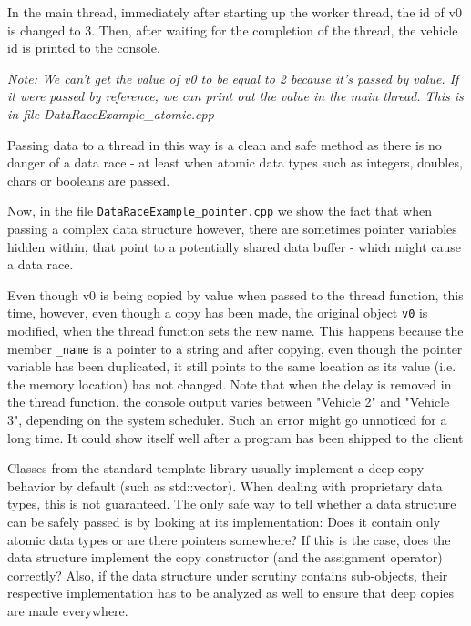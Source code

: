 \documentclass[11pt, a4paper]{article}
\begin{document}
In the main thread, immediately after starting up the worker thread, the id of v0 is changed to 3. Then, after waiting for the completion of the thread, the vehicle id is printed to the console.


\textit{Note: We can't get the value of v0 to be equal to 2 because it's passed by value. If it were passed by reference, we can print out the value in the main thread. This is in file DataRaceExample\_atomic.cpp}




Passing data to a thread in this way is a clean and safe method as there is no danger of a data race - at least when atomic data types such as integers, doubles, chars or booleans are passed.


Now, in the file \texttt{DataRaceExample\_pointer.cpp} we show the fact that when passing a complex data structure however, there are sometimes pointer variables hidden within, that point to a potentially shared data buffer - which might cause a data race. 


Even though v0 is being copied by value when passed to the thread function, this time, however, even though a copy has been made, the original object \texttt{v0} is modified, when the thread function sets the new name. This happens because the member \texttt{\_name} is a pointer to a string and after copying, even though the pointer variable has been duplicated, it still points to the same location as its value (i.e. the memory location) has not changed. Note that when the delay is removed in the thread function, the console output varies between "Vehicle 2" and "Vehicle 3", depending on the system scheduler. Such an error might go unnoticed for a long time. It could show itself well after a program has been shipped to the client





Classes from the standard template library usually implement a deep copy behavior by default (such as std::vector). When dealing with proprietary data types, this is not guaranteed. The only safe way to tell whether a data structure can be safely passed is by looking at its implementation: Does it contain only atomic data types or are there pointers somewhere? If this is the case, does the data structure implement the copy constructor (and the assignment operator) correctly? Also, if the data structure under scrutiny contains sub-objects, their respective implementation has to be analyzed as well to ensure that deep copies are made everywhere.
\end{document}
